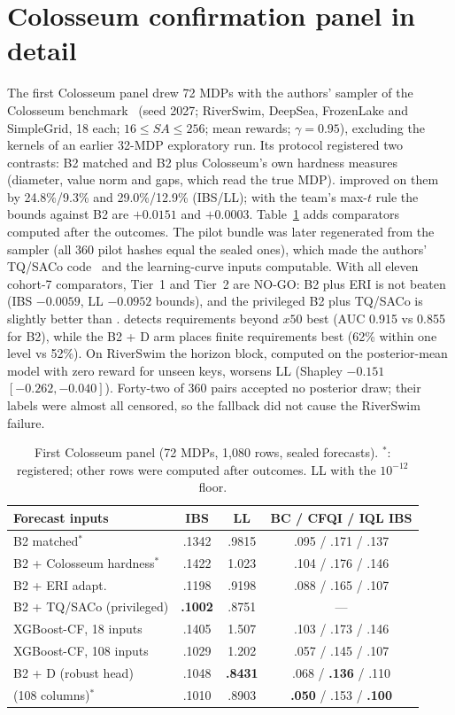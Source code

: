 \section{Colosseum confirmation panel in detail}
\label{supp:colosseum}
The first Colosseum panel drew 72 MDPs with the authors' sampler of the Colosseum benchmark~\cite{conserva2022hardness} (seed 2027; RiverSwim, DeepSea, FrozenLake and SimpleGrid, 18 each; $16\le SA\le256$; mean rewards; $\gamma=0.95$), excluding the kernels of an earlier 32-MDP exploratory run. Its protocol registered two contrasts: B2 matched and B2 plus Colosseum's own hardness measures (diameter, value norm and gaps, which read the true MDP). \OEH{} improved on them by 24.8\%/9.3\% and 29.0\%/12.9\% (IBS/LL); with the team's max-$t$ rule the bounds against B2 are $+0.0151$ and $+0.0003$. Table~\ref{tab:colosseum} adds comparators computed after the outcomes. The pilot bundle was later regenerated from the sampler (all 360 pilot hashes equal the sealed ones), which made the authors' TQ/SACo code~\cite{schweighofer2022dataset} and the learning-curve inputs computable. With all eleven cohort-7 comparators, Tier~1 and Tier~2 are NO-GO: B2 plus ERI is not beaten (IBS $-0.0059$, LL $-0.0952$ bounds), and the privileged B2 plus TQ/SACo is slightly better than \OEH{}. \OEH{} detects requirements beyond $x50$ best (AUC 0.915 vs 0.855 for B2), while the B2 + D arm places finite requirements best (62\% within one level vs 52\%). On RiverSwim the horizon block, computed on the posterior-mean model with zero reward for unseen keys, worsens LL (Shapley $-0.151$ $[-0.262,-0.040]$). Forty-two of 360 pairs accepted no posterior draw; their labels were almost all censored, so the fallback did not cause the RiverSwim failure.

\begin{table}[h]
\centering
\caption{First Colosseum panel (72 MDPs, 1{,}080 rows, sealed forecasts). $^{*}$: registered; other rows were computed after outcomes. LL with the $10^{-12}$ floor.}
\label{tab:colosseum}
\footnotesize
\setlength{\tabcolsep}{3pt}
\begin{tabular}{@{}lccc@{}}
\toprule
Forecast inputs & IBS & LL & BC / CFQI / IQL IBS\\
\midrule
B2 matched$^{*}$ & .1342 & .9815 & .095 / .171 / .137\\
B2 + Colosseum hardness$^{*}$ & .1422 & 1.023 & .104 / .176 / .146\\
B2 + ERI adapt. & .1198 & .9198 & .088 / .165 / .107\\
B2 + TQ/SACo (privileged) & \textbf{.1002} & .8751 & ---\\
XGBoost-CF, 18 inputs & .1405 & 1.507 & .103 / .173 / .146\\
XGBoost-CF, 108 \OEH{} inputs & .1029 & 1.202 & .057 / .145 / .107\\
B2 + D (robust head) & .1048 & \textbf{.8431} & .068 / \textbf{.136} / .110\\
\OEH{} (108 columns)$^{*}$ & .1010 & .8903 & \textbf{.050} / .153 / \textbf{.100}\\
\bottomrule
\end{tabular}
\end{table}

